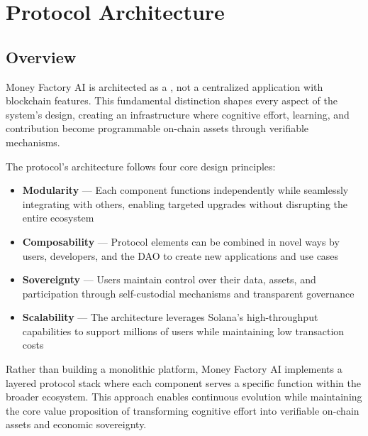\section{Protocol Architecture}


\subsection{Overview}

Money Factory AI is architected as a , not a centralized application with blockchain features. This fundamental distinction shapes every aspect of the system's design, creating an infrastructure where cognitive effort, learning, and contribution become programmable on-chain assets through verifiable mechanisms.

The protocol's architecture follows four core design principles:

\begin{itemize}
    \item \textbf{Modularity} — Each component functions independently while seamlessly integrating with others, enabling targeted upgrades without disrupting the entire ecosystem
    
    \item \textbf{Composability} — Protocol elements can be combined in novel ways by users, developers, and the DAO to create new applications and use cases
    
    \item \textbf{Sovereignty} — Users maintain control over their data, assets, and participation through self-custodial mechanisms and transparent governance
    
    \item \textbf{Scalability} — The architecture leverages Solana's high-throughput capabilities to support millions of users while maintaining low transaction costs
\end{itemize}

Rather than building a monolithic platform, Money Factory AI implements a layered protocol stack where each component serves a specific function within the broader ecosystem. This approach enables continuous evolution while maintaining the core value proposition of transforming cognitive effort into verifiable on-chain assets and economic sovereignty.

